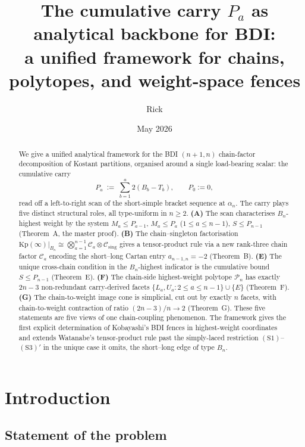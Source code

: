 \documentclass[11pt]{article}
\title{The cumulative carry \texorpdfstring{$P_a$}{Pa} as analytical backbone for BDI:\\
a unified framework for chains, polytopes, and weight-space fences}
\author{Rick}
\date{May 2026}
\theoremstyle{definition}
\theoremstyle{remark}
\newcommand{\Kp}{\mathrm{Kp}}
\newcommand{\Cmid}{\mathcal{C}}
\newcommand{\Csing}{\mathcal{C}_{\mathrm{sing}}}
\newcommand{\Pn}{\mathcal{P}}
\begin{document}
\maketitle

\begin{abstract}
We give a unified analytical framework for the BDI $(n+1, n)$ chain-factor
decomposition of Kostant partitions, organised around a single load-bearing
scalar: the cumulative carry
\[
   P_a \;:=\; \sum_{b=1}^{a} 2(B_b - T_b), \qquad P_0 := 0,
\]
read off a left-to-right scan of the short-simple bracket sequence at $\alpha_n$.
The carry plays five distinct structural roles, all type-uniform in $n \ge 2$.
\textbf{(A)} The scan characterises $B_n$-highest weight by the system
$M_a \le P_{a-1}$, $M_a \le P_a$ ($1 \le a \le n-1$), $S \le P_{n-1}$
(Theorem~A, the master proof).
\textbf{(B)} The chain--singleton factorisation
$\Kp(\infty)|_{B_n} \cong \bigotimes_{a=1}^{n-1} \Cmid_a \otimes \Csing$ gives a
tensor-product rule via a new rank-three chain factor $\Cmid_a$ encoding the
short--long Cartan entry $a_{n-1, n} = -2$ (Theorem~B).
\textbf{(E)} The unique cross-chain condition in the $B_n$-highest indicator is
the cumulative bound $S \le P_{n-1}$ (Theorem~E).
\textbf{(F)} The chain-side highest-weight polytope $\Pn_n$ has exactly $2n - 3$
non-redundant carry-derived facets $\{L_a, U_a : 2 \le a \le n - 1\} \cup \{E\}$
(Theorem~F).
\textbf{(G)} The chain-to-weight image cone is simplicial, cut out by exactly
$n$ facets, with chain-to-weight contraction of ratio
$(2n - 3)/n \to 2$ (Theorem~G).
These five statements are five views of one chain-coupling phenomenon. The
framework gives the first explicit determination of Kobayashi's BDI fences
\cite{Kobayashi2604} in highest-weight coordinates and extends Watanabe's
tensor-product rule \cite[Prop.~5.1.1]{Watanabe2110} past the simply-laced
restriction $(\mathrm{S1})$--$(\mathrm{S3})'$ in the unique case it omits, the
short--long edge of type $B_n$.
\end{abstract}

\tableofcontents

\section{Introduction}

\subsection{Statement of the problem}
\end{document}
